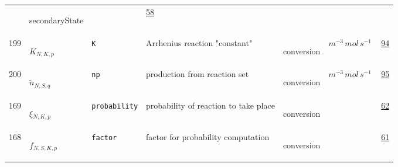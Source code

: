 \begin{longtable}{|p{1cm}|p{2.5cm}|p{4.5cm}|p{8cm}|p{3.0cm}|p{3cm}|p{1cm}|}
             & \begin{lay}secondaryState \end{lay}
             & $  $
             &                 \hyperlink{"e:58"}{ 58 }
                 \\
            199
             & \hypertarget{"v:199"}{ $ {K}{_{N, K, p}} $}
             & \verb|K|
             & Arrhenius reaction "constant"
             & \begin{lay}conversion \end{lay}
             & $ m^{-3} \,mol \,s^{-1} \, $
             &                 \hyperlink{"e:94"}{ 94 }
                 \\
            200
             & \hypertarget{"v:200"}{ $ {{\tilde{n}}}{_{N, S, q}} $}
             & \verb|np|
             & production from reaction set
             & \begin{lay}conversion \end{lay}
             & $ m^{-3} \,mol \,s^{-1} \, $
             &                 \hyperlink{"e:95"}{ 95 }
                 \\
            169
             & \hypertarget{"v:169"}{ $ {\xi}{_{N, K, p}} $}
             & \verb|probability|
             & probability of reaction to take place
             & \begin{lay}conversion \end{lay}
             & $  $
             &                 \hyperlink{"e:62"}{ 62 }
                 \\
            168
             & \hypertarget{"v:168"}{ $ {f}{_{N, S, K, p}} $}
             & \verb|factor|
             & factor for probability computation
             & \begin{lay}conversion \end{lay}
             & $  $
             &                 \hyperlink{"e:61"}{ 61 }
                 \\
    \end{longtable}